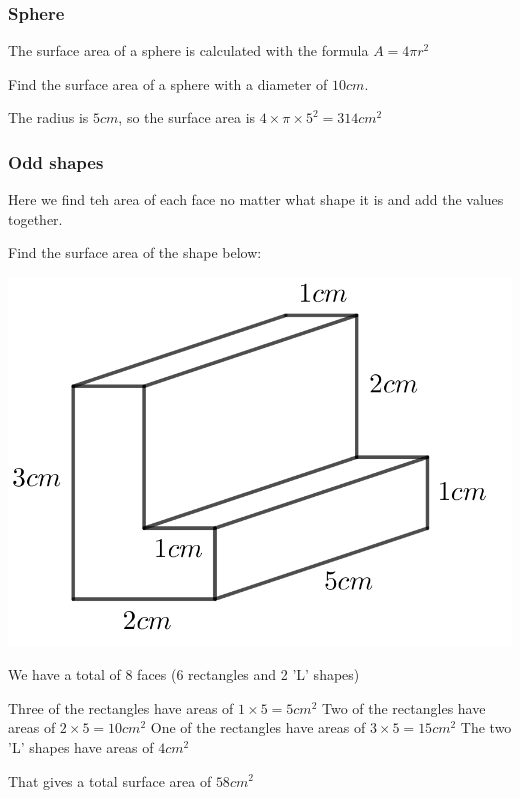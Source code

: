 \subsubsection{Sphere}
The surface area of a sphere is calculated with the formula $A = 4 \pi r^2$

\begin{exmp}
Find the surface area of a sphere with a diameter of $10cm$.

The radius is $5cm$, so the surface area is $4 \times \pi \times 5^2=314cm^2$
\end{exmp}

\subsubsection{Odd shapes}
Here we find teh area of each face no matter what shape it is and add the values together.

\begin{exmp}
Find the surface area of the shape below:

\bigskip

\includegraphics{./Images/Measurement/OddSA.png}

\bigskip

We have a total of 8 faces (6 rectangles and 2 'L' shapes)

Three of the rectangles have areas of $1 \times 5 = 5cm^2$
Two of the rectangles have areas of $2 \times 5 = 10cm^2$
One  of the rectangles have areas of $3 \times 5 = 15cm^2$
The two 'L' shapes have areas of $4cm^2$

That gives a total surface area of $58cm^2$
\end{exmp}
